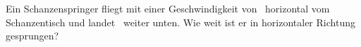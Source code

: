 Ein Schanzenspringer fliegt mit einer Geschwindigkeit von \vsO\ horizontal vom Schanzentisch und landet \hsO\ weiter unten. Wie weit ist er in horizontaler Richtung gesprungen?
